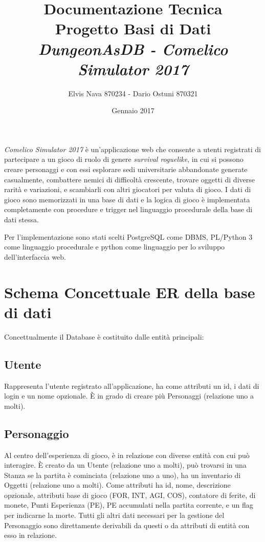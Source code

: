 \documentclass[10pt,a4paper]{article}
\author{Elvis Nava 870234 - Dario Ostuni 870321}
\title{Documentazione Tecnica\\
 Progetto Basi di Dati\\
\textit{DungeonAsDB - Comelico Simulator 2017}}
\date{Gennaio 2017}
\begin{document}
\maketitle

\textit{Comelico Simulator 2017} è un'applicazione web che consente a utenti registrati di partecipare a un gioco di ruolo di genere \textit{survival roguelike}, in cui si possono creare personaggi e con essi esplorare sedi universitarie abbandonate generate casualmente, combattere nemici di difficoltà crescente, trovare oggetti di diverse rarità e variazioni, e scambiarli con altri giocatori per valuta di gioco. I dati di gioco sono memorizzati in una base di dati e la logica di gioco è implementata completamente con procedure e trigger nel linguaggio procedurale della base di dati stessa.

Per l'implementazione sono stati scelti PostgreSQL come DBMS, PL/Python 3 come linguaggio procedurale e python come linguaggio per lo sviluppo dell'interfaccia web.



\section{Schema Concettuale ER della base di dati}
Concettualmente il Database è costituito dalle entità principali:

\subsection{Utente}
Rappresenta l'utente registrato all'applicazione, ha come attributi un id, i dati di login e un nome opzionale. È in grado di creare più Personaggi (relazione uno a molti).

\subsection{Personaggio}
Al centro dell'esperienza di gioco, è in relazione con diverse entità con cui può interagire. È creato da un Utente (relazione uno a molti), può trovarsi in una Stanza se la partita è cominciata (relazione uno a uno), ha un inventario di Oggetti (relazione uno a molti). Come attributi ha id, nome, descrizione opzionale, attributi base di gioco (FOR, INT, AGI, COS), contatore di ferite, di monete, Punti Esperienza (PE), PE accumulati nella partita corrente, e un flag per indicarne la morte. Tutti gli altri dati necessari per la gestione del Personaggio sono direttamente derivabili da questi o da attributi di entità con esso in relazione.
\end{document}
